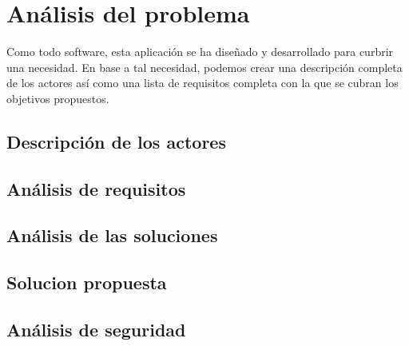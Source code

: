 \chapter{Análisis del problema}
 
 Como todo software, esta aplicación se ha diseñado y desarrollado para curbrir una
 necesidad. En base a tal necesidad, podemos crear una descripción completa de los 
 actores así como una lista de requisitos completa con la que se cubran los objetivos 
 propuestos.

\section{Descripción de los actores}

\section{Análisis de requisitos}

\section{Análisis de las soluciones}

\section{Solucion propuesta}

\section{Análisis de seguridad}
